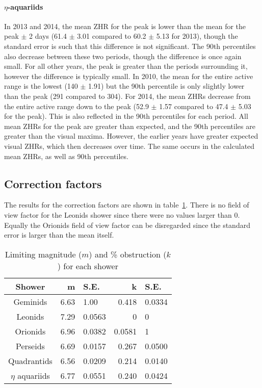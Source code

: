 \paragraph{$\eta$-aquariids\\}
In 2013 and 2014, the mean ZHR for the peak is lower than the mean for the peak $\pm$ 2 days (61.4 $\pm$ 3.01 compared to 60.2 $\pm$ 5.13 for 2013), though the standard error is such that this difference is not significant. The 90th percentiles also decrease between these two periods, though the difference is once again small. For all other years, the peak is greater than the periods surrounding it, however the difference is typically small.
In 2010, the mean for the entire active range is the lowest (140 $\pm$ 1.91) but the 90th percentile is only slightly lower than the peak (291 compared to 304).
For 2014, the mean ZHRs decrease from the entire active range down to the peak (52.9 $\pm$ 1.57 compared to 47.4 $\pm$ 5.03 for the peak). This is also reflected in the 90th percentiles for each period.
All mean ZHRs for the peak are greater than expected, and the 90th percentiles are greater than the visual maxima. However, the earlier years have greater expected visual ZHRs, which then decreases over time. The same occurs in the calculated mean ZHRs, as well as 90th percentiles.

\subsection{Correction factors}
The results for the correction factors are shown in table~\ref{tab:corfac}. There is no field of view factor for the Leonids shower since there were no values larger than 0. Equally the Orionids field of view factor can be disregarded since the standard error is larger than the mean itself.
\begin{table}
	\begin{tabular}{c r@{ \,$\pm$\, }l r@{ \,$\pm$\, }l}
		\hline
		Shower & m & S.E. & k & S.E.\\ \hline
		Geminids & 6.63 & 1.00 & 0.418 & 0.0334 \\
		Leonids & 7.29 & 0.0563 & 0 & 0 \\
		Orionids & 6.96 & 0.0382 & 0.0581 & 1 \\ 
		Perseids & 6.69 & 0.0157 & 0.267 & 0.0500 \\
		Quadrantids & 6.56 & 0.0209 & 0.214 & 0.0140 \\
		$\eta$ aquariids & 6.77 & 0.0551 & 0.240 & 0.0424 \\ \hline
	\end{tabular}
\caption{Limiting magnitude ($m$) and \% obstruction ($k$) for each shower}
\label{tab:corfac}
\end{table}

